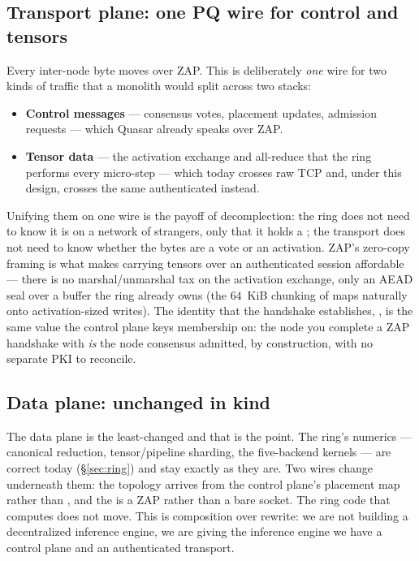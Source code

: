 \documentclass[11pt]{article}
\begin{document}
\subsection{Transport plane: one PQ wire for control and tensors}
\label{sec:transport}

Every inter-node byte moves over ZAP. This is deliberately \emph{one} wire for two kinds of
traffic that a monolith would split across two stacks:
\begin{itemize}[leftmargin=1.4em,itemsep=2pt]
\item \textbf{Control messages} --- consensus votes, placement updates, admission requests ---
which Quasar already speaks over ZAP.
\item \textbf{Tensor data} --- the activation exchange and all-reduce that the ring performs
every micro-step --- which today crosses raw TCP and, under this design, crosses the same
authenticated   instead.
\end{itemize}
Unifying them on one wire is the payoff of decomplection: the ring does not need to know it is on
a network of strangers, only that it holds a ; the transport does not need to know
whether the bytes are a vote or an activation. ZAP's zero-copy framing is what makes carrying
tensors over an authenticated session affordable --- there is no marshal/unmarshal tax on the
activation exchange, only an AEAD seal over a buffer the ring already owns (the $64$~KiB
 chunking of  maps naturally onto activation-sized writes).
The identity that the handshake establishes, , is the same value the control plane
keys membership on: the node you complete a ZAP handshake with \emph{is} the node consensus
admitted, by construction, with no separate PKI to reconcile.

\subsection{Data plane: unchanged in kind}
\label{sec:data}

The data plane is the least-changed and that is the point. The ring's numerics --- canonical
 reduction, tensor/pipeline sharding, the five-backend kernels --- are correct today
(\S\ref{sec:ring}) and stay exactly as they are. Two wires change underneath them: the topology
arrives from the control plane's placement map rather than , and the
 is a ZAP  rather than a bare socket. The ring code that computes
does not move. This is composition over rewrite: we are not building a decentralized inference
engine, we are giving the inference engine we have a control plane and an authenticated
transport.
\end{document}
